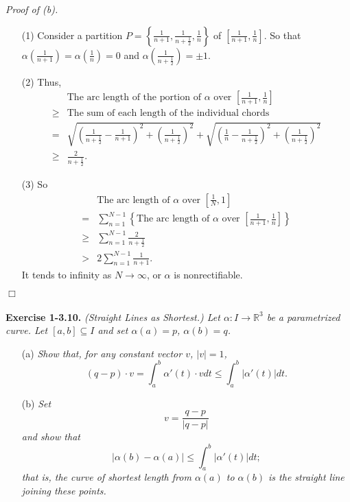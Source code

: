 \documentclass{article}
\begin{document}
\emph{Proof of (b).}
\begin{enumerate}
  \item[(1)]
  Consider a partition
  $P = \left\{ \frac{1}{n+1}, \frac{1}{n+\frac{1}{2}}, \frac{1}{n} \right\}$
  of $\left[ \frac{1}{n+1},\frac{1}{n} \right]$.
  So that $\alpha(\frac{1}{n+1}) = \alpha(\frac{1}{n}) = 0$
  and $\alpha(\frac{1}{n+\frac{1}{2}}) = \pm 1$.

  \item[(2)]
  Thus,
  \begin{align*}
    &\text{The arc length of the portion of $\alpha$ over
      $\left[ \frac{1}{n+1},\frac{1}{n} \right]$} \\
    \geq&
    \text{The sum of each length of the individual chords} \\
    =& \sqrt{
      \left( \frac{1}{n+\frac{1}{2}} - \frac{1}{n+1} \right)^2
        + \left( \frac{1}{n + \frac{1}{2}} \right)^2
    }
    + \sqrt{
      \left( \frac{1}{n} - \frac{1}{n+\frac{1}{2}} \right)^2
        + \left( \frac{1}{n + \frac{1}{2}} \right)^2
    } \\
    \geq&
    \frac{2}{n + \frac{1}{2}}.
  \end{align*}

  \item[(3)]
  So
  \begin{align*}
    &\text{The arc length of $\alpha$ over $\left[\frac{1}{N},1\right]$} \\
    =& \sum_{n=1}^{N-1}
      \left\{
        \text{The arc length of $\alpha$ over $\left[\frac{1}{n+1},\frac{1}{n}\right]$}
      \right\} \\
    \geq& \sum_{n=1}^{N-1} \frac{2}{n + \frac{1}{2}} \\
    >& 2 \sum_{n=1}^{N-1} \frac{1}{n + 1}.
  \end{align*}
  It tends to infinity as $N \to \infty$, or
  $\alpha$ is nonrectifiable.
\end{enumerate}
$\Box$ \\\\






\textbf{Exercise 1-3.10.}
\emph{(Straight Lines as Shortest.)
Let $\alpha: I \to \mathbb{R}^3$ be a parametrized curve.
Let $[a,b] \subseteq I$ and set $\alpha(a) = p$, $\alpha(b) = q$.}
\begin{enumerate}
  \item[(a)]
  \emph{Show that, for any constant vector $v$, $|v| = 1$,
  $$(q-p) \cdot v
  = \int_{a}^{b} \alpha'(t) \cdot v dt
  \leq \int_{a}^{b} |\alpha'(t)| dt.$$}
  \item[(b)]
  \emph{Set
  $$v = \frac{q-p}{|q-p|}$$
  and show that
  $$|\alpha(b) - \alpha(a)| \leq \int_{a}^{b} |\alpha'(t)| dt;$$
  that is, the curve of shortest length from
  $\alpha(a)$ to $\alpha(b)$ is the straight line
  joining these points.} \\
\end{enumerate}
\end{document}
